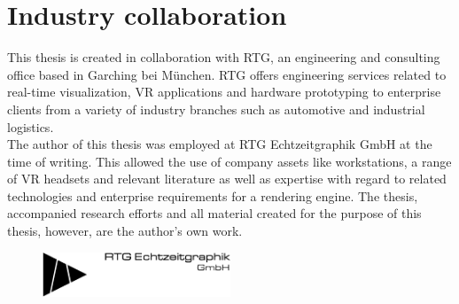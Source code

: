\section{Industry collaboration}
This thesis is created in collaboration with \gls{RTG}, an engineering and consulting office based in Garching bei München. \gls{RTG} offers engineering services related to real-time visualization, \gls{VR} applications and hardware prototyping to enterprise clients from a variety of industry branches such as automotive and industrial logistics\cite{HansiVollmer.2020}. \\
The author of this thesis was employed at RTG Echtzeitgraphik GmbH at the time of writing. This allowed the use of company assets like workstations, a range of \gls{VR} headsets and relevant literature as well as expertise with regard to related technologies and enterprise requirements for a rendering engine. The thesis, accompanied research efforts and all material created for the purpose of this thesis, however, are the author's own work. 

\begin{figure}[htb]
  \centering
  \includegraphics[width=0.5\textwidth]{pictures/RTG_Logo}
\end{figure} 


